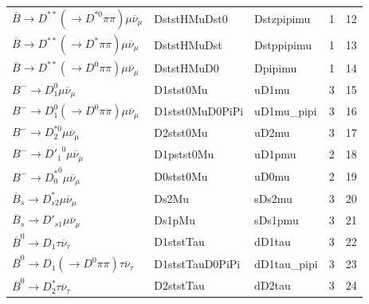 \begin{table}[htb]
\begin{tabular}{lllrr}
 $\overline{B} \rightarrow D^{**} (\rightarrow D^{*0} \pi\pi) \mu \overline{\nu}_\mu$ & DststHMuDst0             & Dstzpipimu        &            1 &      12 \\
 $\overline{B} \rightarrow D^{**} (\rightarrow D^* \pi\pi) \mu \overline{\nu}_\mu$    & DststHMuDst              & Dstppipimu        &            1 &      13 \\
 $\overline{B} \rightarrow D^{**} (\rightarrow D^0 \pi\pi) \mu \overline{\nu}_\mu$    & DststHMuD0               & Dpipimu           &            1 &      14 \\
 $B^- \rightarrow D_1^0 \mu \overline{\nu}_\mu$                                       & D1stst0Mu                & uD1mu             &            3 &      15 \\
 $B^- \rightarrow D_1^0 (\rightarrow D^0 \pi\pi) \mu \overline{\nu}_\mu$              & D1stst0MuD0PiPi          & uD1mu\_pipi       &            3 &      16 \\
 $B^- \rightarrow D_2^{*0} \mu \overline{\nu}_\mu$                                    & D2stst0Mu                & uD2mu             &            3 &      17 \\
 $B^- \rightarrow {D'_1}^0 \mu \overline{\nu}_\mu$                                    & D1pstst0Mu               & uD1pmu            &            2 &      18 \\
 $B^- \rightarrow {D^*_0}^0 \mu \overline{\nu}_\mu$                                   & D0stst0Mu                & uD0mu             &            2 &      19 \\
 $\overline{B}_s \rightarrow D_{s2}^* \mu \overline{\nu}_\mu$                         & Ds2Mu                    & sDs2mu            &            3 &      20 \\
 $\overline{B}_s \rightarrow D'_{s1} \mu \overline{\nu}_\mu$                          & Ds1pMu                   & sDs1pmu           &            3 &      21 \\
 $\overline{B}^0 \rightarrow D_1 \tau \overline{\nu}_\tau$                            & D1ststTau                & dD1tau            &            3 &      22 \\
 $\overline{B}^0 \rightarrow D_1 (\rightarrow D^0 \pi\pi) \tau \overline{\nu}_\tau$   & D1ststTauD0PiPi          & dD1tau\_pipi      &            3 &      23 \\
 $\overline{B}^0 \rightarrow D^*_2 \tau \overline{\nu}_\tau$                          & D2ststTau                & dD2tau            &            3 &      24 \\

\end{tabular}
\end{table}
